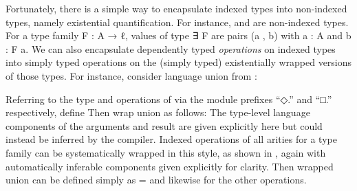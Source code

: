 \documentclass[acmsmall,screen,anonymous,timestamp]{acmart}
\begin{document}
Fortunately, there is a simple way to encapsulate indexed types into non-indexed types, namely existential quantification.
For instance, { } and { } are non-indexed types.
For a type family {\AB F \AK : \AB A \AK →  \AB ℓ}, values of type {\AF ∃ \AB F} are pairs {(\AB a , \AB b)} with {\AB a \AK : \AB A} and {\AB b \AK : \AB F \AB a}.
We can also encapsulate dependently typed \emph{operations} on indexed types into simply typed operations on the (simply typed) existentially wrapped versions of those types.
For instance, consider language union from :
\begin{code}
\>[2]%
\>[7]\AgdaSymbol{:}\AgdaSpace{}%
%
\>[15]%
\>[18]\AgdaSpace{}%
\AgdaSpace{}%
%
\>[28]\AgdaSpace{}%
\AgdaSpace{}%
\AgdaSymbol{(}%
\>[39]%
\>[44]\AgdaSymbol{)}\<%
\end{code}
Referring to the type and operations of  via the module prefixes ``{◇.}\hspace{0.05em}'' and ``{□.}\hspace{0.05em}'' respectively, define 
Then wrap union as follows:
The type-level language components of the arguments and result are given explicitly here but could instead be inferred by the compiler.
\rnc{}
Indexed operations of all arities for a type family  can be systematically wrapped in this style, as shown in
, again with automatically inferable components given explicitly for clarity.
Then wrapped union can be defined simply as { \AS =  } and likewise for the other operations.
\end{document}
